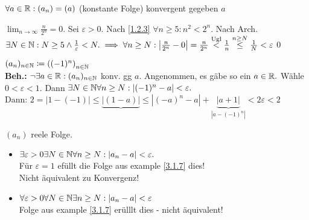 \begin{subexample}
	$ \forall a \in \mathbb{R} : ( a_n ) = (a) $ (konstante Folge) konvergent gegeben $a$
\end{subexample}
\begin{subexample}
	$ \lim_{n \to \infty} \frac{n}{2^n} = 0 $. Sei $ \varepsilon > 0 $. Nach \ref{1.2.3} $ \forall n \geq 5: n^2 < 2^n $. Nach Arch. $ \exists N \in \mathbb{N} : N \geq 5 \wedge \frac{1}{\varepsilon} < N. \implies \forall n \geq N : \left| \frac{n}{2^n} - 0 \right| = \frac{n}{2^n} \overset{\text{Ugl}}{<} \frac{1}{n} \overset{n\geq N}{\leq} \frac{1}{N} < \varepsilon $\qed
\end{subexample}

\begin{subexample}
	$ (a_n)_{n\in\mathbb{N}} \coloneqq \left( (-1)^n\right)_{n\in \mathbb{N}} $\\
	\textbf{Beh.:} $ \neg \exists a \in \mathbb{R} : (a_n)_{n\in\mathbb{N}} $ konv. gg $a$. Angenommen, es gäbe so ein $ a \in \mathbb{R}. $ Wähle $ 0 < \varepsilon < 1 $. Dann $\exists N \in \mathbb{N} \forall n \geq N : \left| (-1)^n - a \right| < \varepsilon. $\\
	Dann: $ 2 = | 1- (-1) | \leq \underbrace{ | ( 1 - a ) |}{\leq \left| (-a)^n - a\right|} + \underbrace{ | a + 1 | }_{\left| a - (-1)^n \right|} < 2 \varepsilon < 2 $
\end{subexample}

\begin{subexample}
	$ (a_n) $ reele Folge.
	\begin{itemize}
		\item $ \exists \varepsilon > 0 \exists N \in \mathbb{N} \forall n \geq N : | a_n - a | < \varepsilon.$\\
			Für $ \varepsilon = 1 $ efüllt die Folge aus example \ref{3.1.7} dies!\\
			Nicht äquivalent zu Konvergenz!
		\item $ \forall \varepsilon > 0 \forall N \in \mathbb{N} \exists n \geq N : | a_n - a | < \varepsilon $\\
			Folge aus example \ref{3.1.7} erülllt dies - nicht äquivalent!
	\end{itemize}
\end{subexample}

